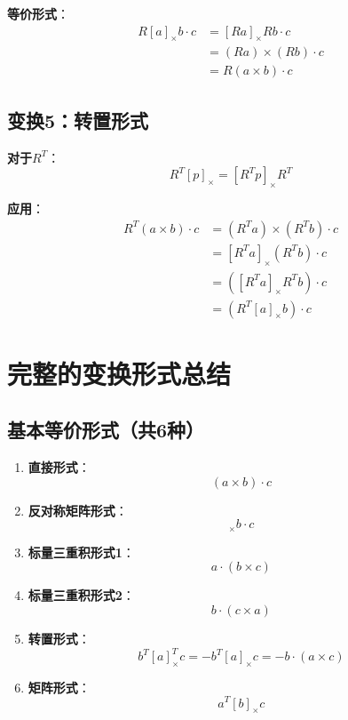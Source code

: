 \documentclass[12pt,a4paper]{article}
\begin{document}
\textbf{等价形式}：
\begin{align}
R [a]_{\times} b \cdot c &= [Ra]_{\times} R b \cdot c \\
&= (Ra) \times (Rb) \cdot c \\
&= R (a \times b) \cdot c
\end{align}

\subsection{变换5：转置形式}

\textbf{对于$R^T$}：
\begin{equation}
R^T [p]_{\times} = [R^T p]_{\times} R^T
\end{equation}

\textbf{应用}：
\begin{align}
R^T (a \times b) \cdot c &= (R^T a) \times (R^T b) \cdot c \\
&= [R^T a]_{\times} (R^T b) \cdot c \\
&= ([R^T a]_{\times} R^T b) \cdot c \\
&= (R^T [a]_{\times} b) \cdot c
\end{align}

\section{完整的变换形式总结}

\subsection{基本等价形式（共6种）}

\begin{enumerate}
\item \textbf{直接形式}：
\begin{equation}
(a \times b) \cdot c
\end{equation}

\item \textbf{反对称矩阵形式}：
\begin{equation}
[a]_{\times} b \cdot c
\end{equation}

\item \textbf{标量三重积形式1}：
\begin{equation}
a \cdot (b \times c)
\end{equation}

\item \textbf{标量三重积形式2}：
\begin{equation}
b \cdot (c \times a)
\end{equation}

\item \textbf{转置形式}：
\begin{equation}
b^T [a]_{\times}^T c = -b^T [a]_{\times} c = -b \cdot (a \times c)
\end{equation}

\item \textbf{矩阵形式}：
\begin{equation}
a^T [b]_{\times} c
\end{equation}
\end{enumerate}
\end{document}
